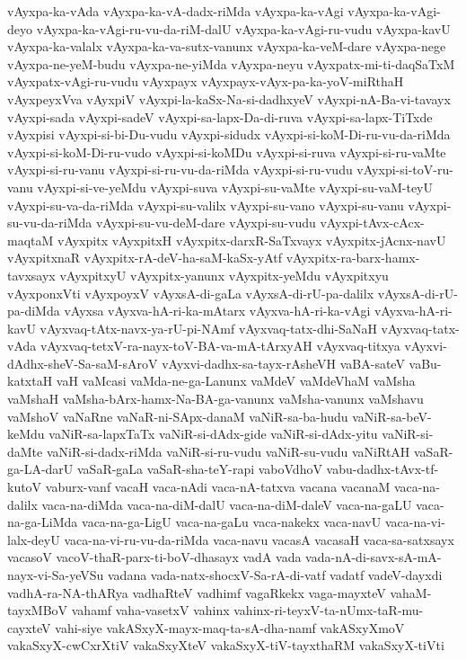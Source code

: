 {vAyxpa-ka-vAda
vAyxpa-ka-vA-dadx-riMda
vAyxpa-ka-vAgi
vAyxpa-ka-vAgi-deyo
vAyxpa-ka-vAgi-ru-vu-da-riM-dalU
vAyxpa-ka-vAgi-ru-vudu
vAyxpa-kavU
vAyxpa-ka-valalx
vAyxpa-ka-va-sutx-vanunx
vAyxpa-ka-veM-dare
vAyxpa-nege
vAyxpa-ne-yeM-budu
vAyxpa-ne-yiMda
vAyxpa-neyu
vAyxpatx-mi-ti-daqSaTxM
vAyxpatx-vAgi-ru-vudu
vAyxpayx
vAyxpayx-vAyx-pa-ka-yoV-miRthaH
vAyxpeyxVva
vAyxpiV
vAyxpi-la-kaSx-Na-si-dadhxyeV
vAyxpi-nA-Ba-vi-tavayx
vAyxpi-sada
vAyxpi-sadeV
vAyxpi-sa-lapx-Da-di-ruva
vAyxpi-sa-lapx-TiTxde
vAyxpisi
vAyxpi-si-bi-Du-vudu
vAyxpi-sidudx
vAyxpi-si-koM-Di-ru-vu-da-riMda
vAyxpi-si-koM-Di-ru-vudo
vAyxpi-si-koMDu
vAyxpi-si-ruva
vAyxpi-si-ru-vaMte
vAyxpi-si-ru-vanu
vAyxpi-si-ru-vu-da-riMda
vAyxpi-si-ru-vudu
vAyxpi-si-toV-ru-vanu
vAyxpi-si-ve-yeMdu
vAyxpi-suva
vAyxpi-su-vaMte
vAyxpi-su-vaM-teyU
vAyxpi-su-va-da-riMda
vAyxpi-su-valilx
vAyxpi-su-vano
vAyxpi-su-vanu
vAyxpi-su-vu-da-riMda
vAyxpi-su-vu-deM-dare
vAyxpi-su-vudu
vAyxpi-tAvx-cAcx-maqtaM
vAyxpitx
vAyxpitxH
vAyxpitx-darxR-SaTxvayx
vAyxpitx-jAcnx-navU
vAyxpitxnaR
vAyxpitx-rA-deV-ha-saM-kaSx-yAtf
vAyxpitx-ra-barx-hamx-tavxsayx
vAyxpitxyU
vAyxpitx-yanunx
vAyxpitx-yeMdu
vAyxpitxyu
vAyxponxVti
vAyxpoyxV
vAyxsA-di-gaLa
vAyxsA-di-rU-pa-dalilx
vAyxsA-di-rU-pa-diMda
vAyxsa
vAyxva-hA-ri-ka-mAtarx
vAyxva-hA-ri-ka-vAgi
vAyxva-hA-ri-kavU
vAyxvaq-tAtx-navx-ya-rU-pi-NAmf
vAyxvaq-tatx-dhi-SaNaH
vAyxvaq-tatx-vAda
vAyxvaq-tetxV-ra-nayx-toV-BA-va-mA-tArxyAH
vAyxvaq-titxya
vAyxvi-dAdhx-sheV-Sa-saM-sAroV
vAyxvi-dadhx-sa-tayx-rAsheVH
vaBA-sateV
vaBu-katxtaH
vaH
vaMcasi
vaMda-ne-ga-Lanunx
vaMdeV
vaMdeVhaM
vaMsha
vaMshaH
vaMsha-bArx-hamx-Na-BA-ga-vanunx
vaMsha-vanunx
vaMshavu
vaMshoV
vaNaRne
vaNaR-ni-SApx-danaM
vaNiR-sa-ba-hudu
vaNiR-sa-beV-keMdu
vaNiR-sa-lapxTaTx
vaNiR-si-dAdx-gide
vaNiR-si-dAdx-yitu
vaNiR-si-daMte
vaNiR-si-dadx-riMda
vaNiR-si-ru-vudu
vaNiR-su-vudu
vaNiRtAH
vaSaR-ga-LA-darU
vaSaR-gaLa
vaSaR-sha-teY-rapi
vaboVdhoV
vabu-dadhx-tAvx-tf-kutoV
vaburx-vanf
vacaH
vaca-nAdi
vaca-nA-tatxva
vacana
vacanaM
vaca-na-dalilx
vaca-na-diMda
vaca-na-diM-dalU
vaca-na-diM-daleV
vaca-na-gaLU
vaca-na-ga-LiMda
vaca-na-ga-LigU
vaca-na-gaLu
vaca-nakekx
vaca-navU
vaca-na-vi-lalx-deyU
vaca-na-vi-ru-vu-da-riMda
vaca-navu
vacasA
vacasaH
vaca-sa-satxsayx
vacasoV
vacoV-thaR-parx-ti-boV-dhasayx
vadA
vada
vada-nA-di-savx-sA-mA-nayx-vi-Sa-yeVSu
vadana
vada-natx-shocxV-Sa-rA-di-vatf
vadatf
vadeV-dayxdi
vadhA-ra-NA-thARya
vadhaRteV
vadhimf
vagaRkekx
vaga-mayxteV
vahaM-tayxMBoV
vahamf
vaha-vasetxV
vahinx
vahinx-ri-teyxV-ta-nUmx-taR-mu-cayxteV
vahi-siye
vakASxyX-mayx-maq-ta-sA-dha-namf
vakASxyXmoV
vakaSxyX-cwCxrXtiV
vakaSxyXteV
vakaSxyX-tiV-tayxthaRM
vakaSxyX-tiVti
}
